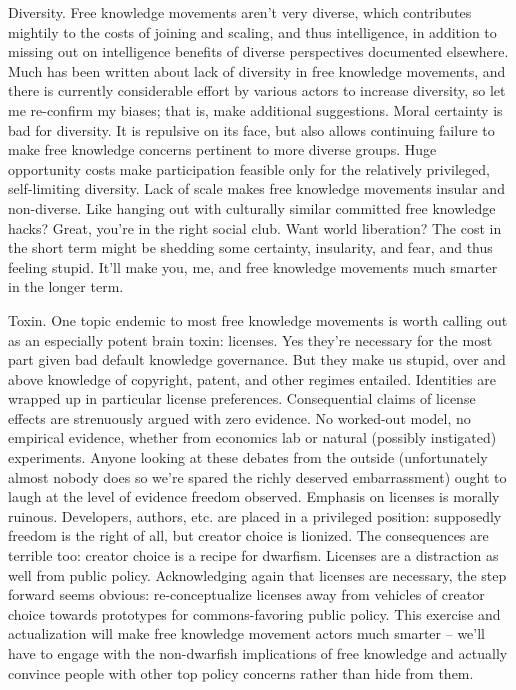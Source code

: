 Diversity. Free knowledge movements aren't very diverse, which
contributes mightily to the costs of joining and scaling, and thus
intelligence, in addition to missing out on intelligence benefits of
diverse perspectives documented elsewhere. Much has been written about
lack of diversity in free knowledge movements, and there is currently
considerable effort by various actors to increase diversity, so let me
re-confirm my biases; that is, make additional suggestions. Moral
certainty is bad for diversity. It is repulsive on its face, but also
allows continuing failure to make free knowledge concerns pertinent to
more diverse groups. Huge opportunity costs make participation feasible
only for the relatively privileged, self-limiting diversity. Lack of
scale makes free knowledge movements insular and non-diverse. Like
hanging out with culturally similar committed free knowledge hacks?
Great, you're in the right social club. Want world liberation? The cost
in the short term might be shedding some certainty, insularity, and
fear, and thus feeling stupid. It'll make you, me, and free knowledge
movements much smarter in the longer term.

Toxin. One topic endemic to most free knowledge movements is worth
calling out as an especially potent brain toxin: licenses. Yes they're
necessary for the most part given bad default knowledge governance. But
they make us stupid, over and above knowledge of copyright, patent, and
other regimes entailed. Identities are wrapped up in particular license
preferences. Consequential claims of license effects are strenuously
argued with zero evidence. No worked-out model, no empirical evidence,
whether from economics lab or natural (possibly instigated) experiments.
Anyone looking at these debates from the outside (unfortunately almost
nobody does so we're spared the richly deserved embarrassment) ought to
laugh at the level of evidence freedom observed. Emphasis on licenses is
morally ruinous. Developers, authors, etc. are placed in a privileged
position: supposedly freedom is the right of all, but creator choice is
lionized. The consequences are terrible too: creator choice is a recipe
for dwarfism. Licenses are a distraction as well from public policy.
Acknowledging again that licenses are necessary, the step forward seems
obvious: re-conceptualize licenses away from vehicles of creator choice
towards prototypes for commons-favoring public policy. This exercise and
actualization will make free knowledge movement actors much smarter --
we'll have to engage with the non-dwarfish implications of free
knowledge and actually convince people with other top policy concerns
rather than hide from them.

